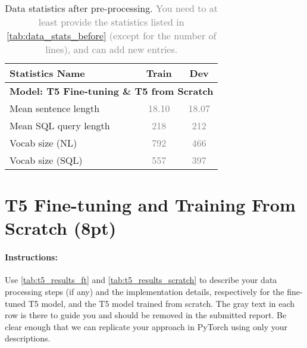 \documentclass{article}
\begin{document}
\begin{table}[h!]
\centering
\begin{tabular}{lcc}
\toprule
Statistics Name & Train & Dev \\
\midrule
\multicolumn{3}{l}{\textbf{Model: T5 Fine-tuning \& T5 from Scratch}} \\ %
Mean sentence length & \textcolor{gray}{18.10}& \textcolor{gray}{18.07} \\
Mean SQL query length & \textcolor{gray}{218}& \textcolor{gray}{212} \\
Vocab size (NL) & \textcolor{gray}{792}& \textcolor{gray}{466} \\
Vocab size (SQL) & \textcolor{gray}{557}& \textcolor{gray}{397} \\
\bottomrule
\end{tabular}
\caption{Data statistics after pre-processing. \textcolor{gray}{You need to at least provide the statistics listed in \autoref{tab:data_stats_before} (except for the number of lines), and can add new entries.}}
\label{tab:data_stats_after}
\end{table}



\newpage




\section{T5 Fine-tuning and Training From Scratch (8pt)}\label{sec:t5}
\paragraph{Instructions:} Use \autoref{tab:t5_results_ft} and \autoref{tab:t5_results_scratch} to describe your data processing steps (if any) and the implementation details, respectively for the fine-tuned T5 model, and the T5 model trained from scratch.
The gray text in each row is there to guide you and should be removed in the submitted report. 
Be clear enough that we can replicate your approach in PyTorch using only your descriptions.
\end{document}
